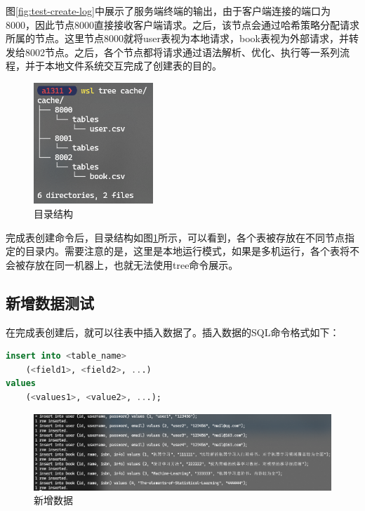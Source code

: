 图\ref{fig:test-create-log}中展示了服务端终端的输出，由于客户端连接的端口为8000，因此节点8000直接接收客户端请求。之后，该节点会通过哈希策略分配请求所属的节点。这里节点8000就将user表视为本地请求，book表视为外部请求，并转发给8002节点。之后，各个节点都将请求通过语法解析、优化、执行等一系列流程，并于本地文件系统交互完成了创建表的目的。

\begin{figure}[H]
    \includegraphics[width=0.4\textwidth]{examples/目录.png}
    \centering
    \caption{目录结构}
    \label{fig:dir}
\end{figure}

完成表创建命令后，目录结构如图\ref{fig:dir}所示，可以看到，各个表被存放在不同节点指定的目录内。需要注意的是，这里是本地运行模式，如果是多机运行，各个表将不会被存放在同一机器上，也就无法使用tree命令展示。

\subsection{新增数据测试}

在完成表创建后，就可以往表中插入数据了。插入数据的SQL命令格式如下：

\begin{lstlisting}[language=sql]
insert into <table_name>
    (<field1>, <field2>, ...)
values
    (<values1>, <value2>, ...);
\end{lstlisting}

\begin{figure}[H]
    \includegraphics[width=\textwidth]{examples/插入数据.png}
    \centering
    \caption{新增数据}
    \label{fig:insert}
\end{figure}

